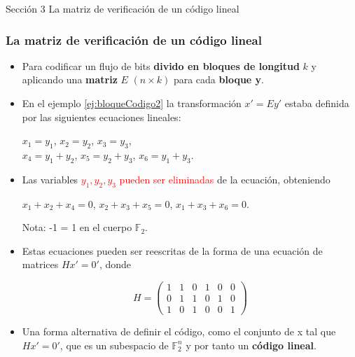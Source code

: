 \documentclass{beamer}
\theoremstyle{plain}
\theoremstyle{example}
\theoremstyle{example}
\begin{document}
\begin{frame}   \footnotesize
{
\begin{block}{Sección 3}
La matriz de verificación de un código lineal
\end{block}
}
\end{frame} 
\begin{frame} \frametitle{La matriz de verificación de un código lineal}\footnotesize  
\begin{itemize} 

\item Para codificar un flujo de bits \textbf{divido en bloques de longitud }$k$ y aplicando una \textbf{matriz} $E$ $(n \times k)$ para cada \textbf{bloque y}. 

\item En el ejemplo \ref{ej:bloqueCodigo2} la transformación $x' =E y'$ estaba definida por las siguientes ecuaciones lineales:

\begin{center}
$x_1 =y_1$,	 $x_2 =y_2$,	$x_3 =y_3$,\\
$x_4 =y_1 +y_2$,	$x_5 =y_2 +y_3$,	$x_6 =y_1 +y_3$.
\end{center}

\item Las variables \textcolor{red}{$y_1, y_2, y_3$ pueden ser eliminadas} de la ecuación, obteniendo

\begin{center}
$x_1 +x_2 +x_4 =0$,	$x_2 +x_3 +x_5=0$,	$x_1 +x_3 +x_6 =0$.
\end{center}

\tiny{
\begin{center}
Nota: -1 = 1 en el cuerpo $\mathbb{F}_2$. 
\end{center}
}

\footnotesize
\item Estas ecuaciones pueden ser reescritas de la forma de una ecuación de matrices $Hx' = 0'$, donde

\[
   H=      \left( \begin{array}{cccccc}
                  1 & 1 & 0 & 1 & 0 & 0\\
                  0 & 1 & 1 & 0 & 1 & 0  \\   
                  1 & 0 & 1 & 0 & 0 & 1  
           			\end{array}
    		\right) 	    		
\]

\item Una forma alternativa de definir el código, como  el conjunto de x tal que $Hx' = 0'$, que es un subespacio de $\mathbb{F}_2^n$ y por tanto un \textbf{código lineal}. 

\end{itemize} \end{frame} 
\end{document}
